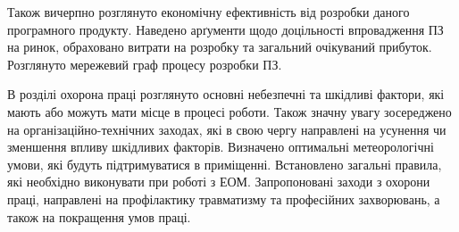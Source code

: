 \par 

\par Також вичерпно розглянуто економічну ефективність від розробки даного програмного продукту. Наведено арґументи щодо доцільності впровадження ПЗ на ринок, обраховано витрати на розробку та загальний очікуваний прибуток. Розглянуто мережевий граф процесу розробки ПЗ.

\par В розділі охорона праці розглянуто основні небезпечні та шкідливі фактори, які мають або можуть мати місце в процесі роботи. Також значну увагу зосереджено на організаційно-технічних заходах, які в свою чергу направлені на усунення чи зменшення впливу шкідливих факторів. Визначено оптимальні метеорологічні умови, які будуть підтримуватися в приміщенні. Встановлено загальні правила, які необхідно виконувати при роботі з ЕОМ. Запропоновані заходи з охорони праці, направлені на профілактику травматизму та професійних захворювань, а також на покращення умов праці.



